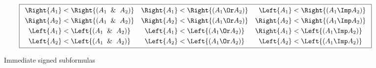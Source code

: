 
\begin{figure}
  \begin{center}
    \[
    \boxed{
      \begin{array}{lcr}
        \begin{aligned}
          \Right{A_1} &< \Right{(A_1 \And A_2)} \\
          \Right{A_2} &< \Right{(A_1 \And A_2)} \\
          \Left{A_1} &< \Left{(A_1 \And A_2)} \\
          \Left{A_2} &< \Left{(A_1 \And A_2)} \\
        \end{aligned}
        &
        \begin{aligned}
          \Right{A_1} &< \Right{(A_1 \Or A_2)} \\
          \Right{A_2} &< \Right{(A_1 \Or A_2)} \\
          \Left{A_1} &< \Left{(A_1 \Or A_2)} \\
          \Left{A_2} &< \Left{(A_1 \Or A_2)} \\
        \end{aligned}
        &
        \begin{aligned}
          \Left{A_1} &< \Right{(A_1 \Imp A_2)} \\
          \Right{A_2} &< \Right{(A_1 \Imp A_2)} \\
          \Right{A_1} &< \Left{(A_1 \Imp A_2)} \\
          \Left{A_2} &< \Left{(A_1 \Imp A_2)} \\
        \end{aligned}
      \end{array}
    }
    \]
  \end{center}
  \caption{Immediate signed subformulas}
  \label{prop.subformulas}
\end{figure}

